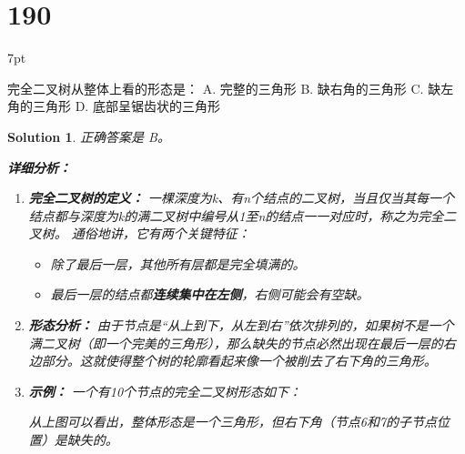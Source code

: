 \documentclass[UTF8]{report}
\newtheorem{solution}{Solution}
\theoremstyle{MyLineTheoremStyle} %
\theoremstyle{MyBlockTheoremStyle} %
\theoremstyle{MySubsubsectionStyle} %
\newenvironment{graybox}{%
        \def\FrameCommand{%
        \hspace{1pt}%
        {\color{gray}\small \vrule width 2pt}%
        {\color{graybox_color}\vrule width 4pt}%
        \colorbox{graybox_color}%
        }%
        \MakeFramed{\advance\hsize-\width\FrameRestore}%
        \noindent\hspace{-4.55pt}%
        \begin{adjustwidth}{}{7pt}%
        \vspace{2pt}\vspace{2pt}%
        }
        {%
        \vspace{2pt}\end{adjustwidth}\endMakeFramed%
        }
\begin{document}
\section*{190}
\begin{graybox}
完全二叉树从整体上看的形态是：
A. 完整的三角形
B. 缺右角的三角形
C. 缺左角的三角形
D. 底部呈锯齿状的三角形
\end{graybox}

\begin{solution}
正确答案是 B。

\textbf{详细分析：}

\begin{enumerate}
    \item \textbf{完全二叉树的定义：}
    一棵深度为k、有n个结点的二叉树，当且仅当其每一个结点都与深度为k的满二叉树中编号从1至n的结点一一对应时，称之为完全二叉树。
    通俗地讲，它有两个关键特征：
    \begin{itemize}
        \item 除了最后一层，其他所有层都是完全填满的。
        \item 最后一层的结点都\textbf{连续集中在左侧}，右侧可能会有空缺。
    \end{itemize}

    \item \textbf{形态分析：}
    由于节点是“从上到下，从左到右”依次排列的，如果树不是一个满二叉树（即一个完美的三角形），那么缺失的节点必然出现在最后一层的右边部分。这就使得整个树的轮廓看起来像一个被削去了右下角的三角形。

    \item \textbf{示例：}
    一个有10个节点的完全二叉树形态如下：
    \begin{center}
    \end{center}
    从上图可以看出，整体形态是一个三角形，但右下角（节点6和7的子节点位置）是缺失的。


\end{enumerate}
\end{solution}
\end{document}
